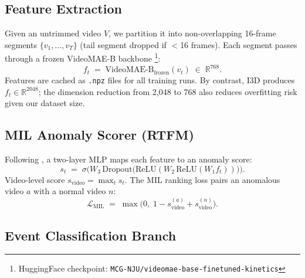 \documentclass[11pt]{article}
\begin{document}
\subsection{Feature Extraction}

Given an untrimmed video $V$, we partition it into non-overlapping 16-frame
segments $\{v_1,\ldots,v_T\}$ (tail segment dropped if $<$16 frames).
Each segment passes through a frozen VideoMAE-B
backbone \citep{tong2022videomae}%
\footnote{HuggingFace checkpoint: \texttt{MCG-NJU/videomae-base-finetuned-kinetics}}:
\begin{equation}
  f_t \;=\; \mathrm{VideoMAE\text{-}B}_{\mathrm{frozen}}(v_t)
       \;\in\; \mathbb{R}^{768}.
\end{equation}
Features are cached as \texttt{.npz} files for all training runs.
By contrast, I3D produces $f_t\in\mathbb{R}^{2048}$; the dimension reduction
from 2{,}048 to 768 also reduces overfitting risk given our dataset size.

\subsection{MIL Anomaly Scorer (RTFM)}

Following \citet{tian2021weakly}, a two-layer MLP maps each feature
to an anomaly score:
\begin{equation}
  s_t \;=\; \sigma\!\bigl(W_3\,
            \mathrm{Dropout}\bigl(\mathrm{ReLU}(W_2\,\mathrm{ReLU}(W_1 f_t))\bigr)
            \bigr).
\end{equation}
Video-level score $s_\mathrm{video}=\max_t s_t$.
The MIL ranking loss pairs an anomalous video $a$ with a normal video $n$:
\begin{equation}
  \mathcal{L}_\mathrm{MIL} \;=\;
    \max\!\bigl(0,\;1 - s^{(a)}_\mathrm{video} + s^{(n)}_\mathrm{video}\bigr).
\end{equation}

\subsection{Event Classification Branch}
\end{document}
